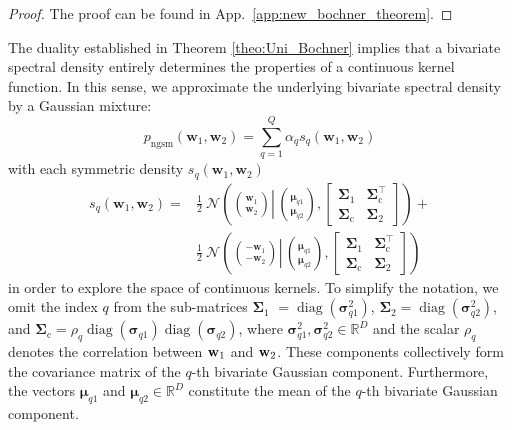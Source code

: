 \begin{proof}
The proof can be found in App.~\ref{app:new_bochner_theorem}.
\end{proof}
\vspace{-0.15in}
The duality established in Theorem \ref{theo:Uni_Bochner} implies that a bivariate spectral density entirely determines the properties of a continuous kernel function. In this sense, we approximate the underlying bivariate spectral density by a Gaussian mixture: 
\begin{equation}
    \label{eq:spectral_density_of_Next-Gen_SM} 
    p_{\text{ngsm}} \left(\mathbf{w}_1, \mathbf{w}_2\right)=\sum_{q=1}^{Q} \alpha_q s_q\left(\mathbf{w}_1, \mathbf{w}_2\right) 
\end{equation}
with each symmetric density $s_q\left(\mathbf{w}_1, \mathbf{w}_2\right)$ 
\begin{equation}
\begin{aligned}
  \!\!s_q(\mathbf{w}_1, \mathbf{w}_2)\!= & \frac{1}{2} ~  \mathcal{N}\left( \! \left.\binom{\mathbf{w}_{1}}{\mathbf{w}_{2}} \right\rvert\,\binom{\boldsymbol{\mu}_{q1}}{\boldsymbol{\mu}_{q2}}, \begin{bmatrix}
      \bm \Sigma_{1}\!&\!\bm \Sigma_{\text{c}}^{\top} \\
    \bm \Sigma_{\text{c}}\!&\!\bm \Sigma_2
  \end{bmatrix} \right) + \\ 
 & \frac{1}{2} ~ \mathcal{N}\left(\!\left.\binom{-\mathbf{w}_{1}}{-\mathbf{w}_{2}} \right\rvert\,\binom{\boldsymbol{\mu}_{q1}}{\boldsymbol{\mu}_{q2}}, \begin{bmatrix}
      \bm \Sigma_{1}\!&\!\bm \Sigma_{\text{c}}^{\top} \\
    \bm \Sigma_{\text{c}}\!&\!\bm \Sigma_2
  \end{bmatrix} \right) 
\end{aligned}
\label{eq:s_q}
\end{equation}
in order to explore the space of continuous kernels. To simplify the notation, we omit the index \(q\) from the sub-matrices $\bm \Sigma_1$ \(\!=\!\operatorname{diag}(\bm{\sigma}_{q1}^2)\), \(\bm \Sigma_2\!=\! \operatorname{diag}(\bm{\sigma}_{q2}^2)\), and \(\bm \Sigma_{\mathrm{c}}\!=\!\rho_q \operatorname{diag}(\bm{\sigma}_{q1}) \operatorname{diag}(\bm{\sigma}_{q2})\), where \(\bm{\sigma}_{q1}^2, \bm{\sigma}_{q2}^2\in\mathbb{R}^D\) and the scalar \(\rho_q\) denotes the correlation between \({\mathbf w}_1\) and \({\mathbf w}_2\). These components collectively form the covariance matrix of the \(q\)-th bivariate Gaussian component. Furthermore, the vectors \(\boldsymbol{\mu}_{q1}\) and \(\boldsymbol{\mu}_{q2} \in \mathbb{R}^D\) constitute the mean of the \(q\)-th bivariate Gaussian component. 

